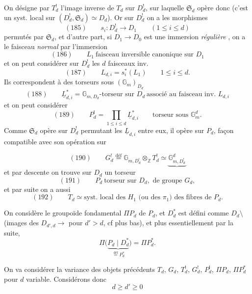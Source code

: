 \documentclass[11pt,a4paper]{article}
\begin{document}
On désigne par $T^{!}_d$ l'image inverse de $T_d$ sur $D^{!}_d$, sur laquelle
$\mathfrak{S}_d$ opère donc (c'est un \struck{\ill{}} syst. local sur
$(D^{!}_d, \mathfrak{S}_d) \simeq D_d$). Or sur $D^{!}_d$ on a les
 morphismes
\[
  (185) \qquad s_i : D^{!}_d \longrightarrow D_1 \qquad (1 \leqslant i \leqslant d)
\]
permutés par $\mathfrak{S}_d$, et d'autre part, si $D_1 \to D_0$ est une
immersion \emph{régulière} , on a 
le faisceau \emph{normal} par l'immersion
\[
  (186) \qquad L_1 \ \text{faisceau inversible canonique sur } D_1
\]
et on peut considérer sur $D^{!}_d$ les $d$ faisceaux inv.
\[
  (187) \qquad L_{d,i} = s_i^{*}(L_1) \qquad 1 \leqslant i \leqslant d .
\]
Ils correspondent à des torseurs sous $(\mathbb{G}_m)_{D_d}$
\[
  (188) \qquad \underline{L}^{*}_{d,i} = \mathbb{G}_{m,D_d}\text{-torseur sur } D_d
  \ \text{associé au faisceau inv. } L_{d,i}
\]
et on peut considérer
\[
  (189) \qquad P^{!}_d = \prod_{1 \leqslant i \leqslant d} \underline{L}^{*}_{d,i}
  \qquad \text{torseur sous } \mathbb{G}_m^{d} .
\]
Comme $\mathfrak{S}_d$ opère sur $D^{!}_d$ permutant les 
$\underline{L}_{d,i}$ entre eux, il opère sur $P_d$,  
 façon compatible avec son opération sur

\[
  (190) \qquad G^{!}_d \overset{\text{déf}}{=} \mathbb{G}_{m,D^{!}_d} \otimes_{\mathbb{Z}} T^{!}_d
  \simeq \underbrace{\mathbb{G}^{d}_{m,D^{!}_d}}
\]
et par descente on trouve sur $D_d$ un torseur
\[
  (191) \qquad P_d \ \text{torseur sur } D_d, \text{ de groupe } G_d ,
\]
et par suite on a aussi
\[
  (192) \qquad T_d \simeq \text{syst. local des } H_1 \text{ (ou des } \pi_1)
  \text{ des fibres de } P_d .
\]

On considère le groupoïde fondamental $\Pi P_d$ de $P_d$, et
  $D^{*}_d$ est défini comme
$D_d \setminus{}$(images des $D_{d',d} \to$  pour $d' > d$, cf
plus bas), et plus essentiellement par la suite,
\[
  \Pi\bigl(\underbrace{P_d \mid D^{*}_d}_{\overset{\text{déf}}{=} P^{*}_d}\bigr) = \Pi P^{*}_d .
\]

On va considérer la variance des objets précédents $T_d$, $G_d$,
 $T^{!}_d$, $G^{!}_d$, $P^{!}_d$, $\Pi P_d$, $\Pi P^{*}_d$
pour $d$ variable. Considérons donc 
\[
  d \geqslant d' \geqslant 0
\]
\end{document}
